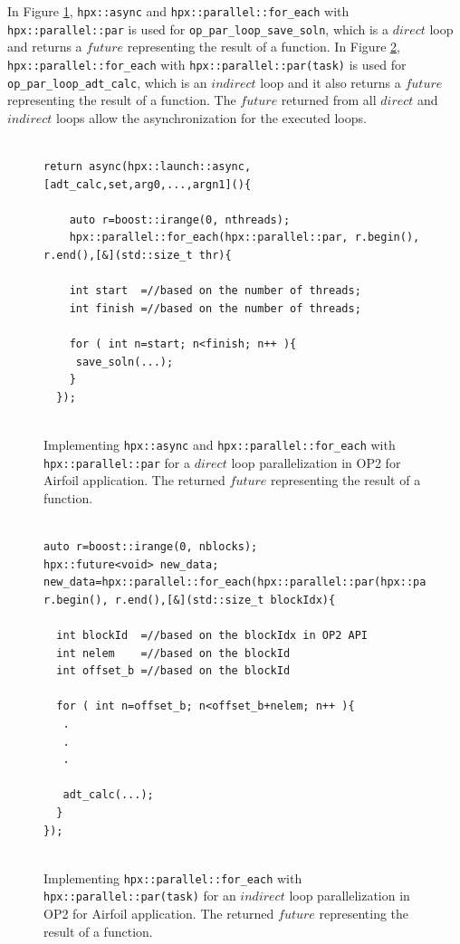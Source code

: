 \documentclass[conference]{IEEEtran}
\begin{document}
In Figure \ref{l6}, \texttt{hpx::async} and \texttt{hpx::parallel::for\_each} with \texttt{hpx::parallel::par} is used for \texttt{op\_par\_loop\_save\_soln}, which is a $direct$ loop and returns a $future$ representing the result of a function. In Figure \ref{l6b},  \texttt{hpx::parallel::for\_each} with \texttt{hpx::parallel::par(task)} is used for \texttt{op\_par\_loop\_adt\_calc}, which is an $indirect$ loop and it also returns a $future$ representing the result of a function. The $future$ returned from all $direct$ and $indirect$ loops allow the asynchronization for the executed loops.

\begin{figure} 
    \begin{lstlisting}    

return async(hpx::launch::async,[adt_calc,set,arg0,...,argn1](){

    auto r=boost::irange(0, nthreads);
    hpx::parallel::for_each(hpx::parallel::par, r.begin(), r.end(),[&](std::size_t thr){
  
    int start  =//based on the number of threads;
    int finish =//based on the number of threads;
        
    for ( int n=start; n<finish; n++ ){
     save_soln(...);
    }
  });
  
    \end{lstlisting}
    \caption{\small{Implementing \texttt{hpx::async} and \texttt{hpx::parallel::for\_each} with \texttt{hpx::parallel::par} for a $direct$ loop parallelization in OP2 for Airfoil application. The returned $future$ representing the result of a function.}}
    \label{l6}
\end{figure}


\begin{figure} 
    \begin{lstlisting}    

auto r=boost::irange(0, nblocks);
hpx::future<void> new_data;
new_data=hpx::parallel::for_each(hpx::parallel::par(hpx::parallel::task), r.begin(), r.end(),[&](std::size_t blockIdx){
  
  int blockId  =//based on the blockIdx in OP2 API
  int nelem    =//based on the blockId 
  int offset_b =//based on the blockId
        
  for ( int n=offset_b; n<offset_b+nelem; n++ ){
   .
   .
   .

   adt_calc(...);
  }
});
  
    \end{lstlisting}
    \caption{\small{Implementing \texttt{hpx::parallel::for\_each} with \texttt{hpx::parallel::par(task)} for an $indirect$ loop parallelization in OP2 for Airfoil application. The returned $future$ representing the result of a function.}}
    \label{l6b}
\end{figure}
\end{document}

